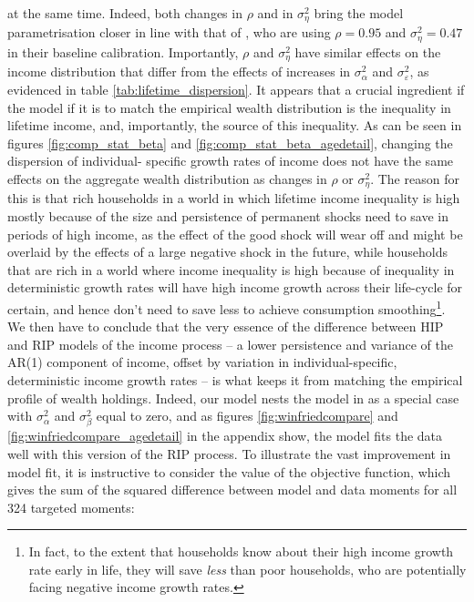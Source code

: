 at the same time. Indeed, both changes in $\rho$ and in $\sigma^2_{\eta}$ bring
the model parametrisation closer in line with that of \citet{HintermaierKoeniger2011},
who are using $\rho=0.95$ and $\sigma^2_{\eta}=0.47$ in their baseline calibration.
Importantly, $\rho$ and $\sigma^2_{\eta}$ have similar effects on the income 
distribution that differ from the effects of increases in $\sigma^2_{\alpha}$ and
$\sigma^2_{\varepsilon}$, as evidenced in table \ref{tab:lifetime_dispersion}.
It appears that a crucial ingredient if the model if it is to match the empirical
wealth distribution is the inequality in lifetime income, and, importantly, the
source of this inequality. As can be seen in figures \ref{fig:comp_stat_beta} and
\ref{fig:comp_stat_beta_agedetail}, changing the dispersion of individual-
specific growth rates of income does not have the same effects on the 
aggregate wealth distribution as changes in $\rho$ or $\sigma^2_{\eta}$. The 
reason for this is that rich households in a world in which lifetime income 
inequality is high mostly because of the size and persistence of permanent shocks
need to save in periods of high income, as the effect of the good shock will wear
off and might be overlaid by the effects of a large negative shock in the future,
while households that are rich in a world where income inequality is high because
of inequality in deterministic growth rates will have high income growth across
their life-cycle for certain, and hence don't need to save less to achieve 
consumption smoothing\footnote{In fact, to the extent that households know about
their high income growth rate early in life, they will save \textit{less} than 
poor households, who are potentially facing negative income growth rates.}.
We then have to conclude that the very essence of the difference between HIP and
RIP models of the income process -- a lower persistence and variance of the AR(1)
component of income, offset by variation in individual-specific, deterministic
income growth rates -- is what keeps it from matching the empirical profile of
wealth holdings. Indeed, our model nests the model in \citet{HintermaierKoeniger2011}
as a special case with $\sigma^2_{\alpha}$ and $\sigma^2_{\beta}$ equal to zero,
and as figures \ref{fig:winfriedcompare} and \ref{fig:winfriedcompare_agedetail} in 
the appendix show, the model fits the data well with this version of the RIP 
process. To illustrate the vast improvement in model fit, it is instructive
to consider the value of the objective function, which gives the sum of the 
squared difference between model and data moments for all 324 targeted moments:
